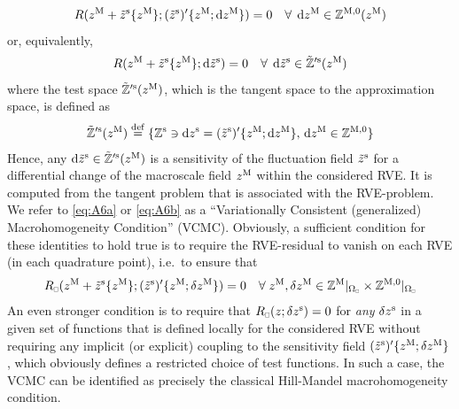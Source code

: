 \documentclass{bmcart}
\newcommand{\eqtref}[1]{\eqref{#1}}
\newcommand{\rve}{
  {\mathchoice
   {\mbox{\scalebox{0.67}{$\Box$}}}
   {\mbox{\scalebox{0.67}{$\Box$}}}
   {\mbox{\scalebox{0.5}{$\Box$}}}
   {\mbox{\scalebox{0.375}{$\Box$}}}
  }
}
\begin{document}
\begin{align}
\label{eq:A6a} R(z^\macro + \tilde z^\fluct\{z^\macro\}; (\tilde{z}^\fluct)'\{z^\macro;\dif z^\macro\}) = 0\quad \forall\;\dif z^\macro\in\set Z^{\macro,0}(z^\macro)
\end{align}
or, equivalently,
\begin{align}
\label{eq:A6b} R(z^\macro + \tilde z^\fluct\{z^\macro\}; \dif\tilde{z}^\fluct) = 0\quad \forall\;\dif\tilde{z}^\fluct\in\tilde{\set Z}'^{\fluct}(z^\macro)
\end{align}
where the test space $\tilde{\mathbb{Z}}'^{\mathrm{s}}(z^{\mathrm{M}})$, which is the tangent space to the approximation space, is defined as
\begin{align}
    \tilde{\set{Z}}'^{\fluct}(z^\macro)\defeq\{\set{Z}^\fluct\ni \dif z^\fluct = (\tilde{z}^\fluct)'\{z^\macro;\dif z^\macro\},\,
    \dif z^\macro\in \set{Z}^{\macro,0}\}
\label{eq:A6c}
\end{align}
Hence, any $\operatorname{d \!} \tilde{z}^{\mathrm{s}}\in\tilde{\mathbb{Z}}'^{\mathrm{s}}(z^{\mathrm{M}})$ is a sensitivity of the fluctuation field $\tilde{z}^{\mathrm{s}}$ for a differential change of the macroscale field $z^{\mathrm{M}}$ within the considered RVE.
It is computed from the tangent problem that is associated with the RVE-problem.
We refer to \eqtref{eq:A6a} or \eqtref{eq:A6b} as a ``Variationally Consistent (generalized) Macrohomogeneity Condition'' (VCMC).
Obviously, a sufficient condition for these identities to hold true is to require the RVE-residual to vanish on each RVE (in each quadrature point), i.e.\ to ensure that
\begin{align}
\label{eq:A8} R_\rve(z^\macro + \tilde z^\fluct\{z^\macro\};(\tilde{z}^\fluct)'\{z^\macro;\delta z^\macro\}) = 0\quad \forall\;z^\macro,\delta z^\macro\in\set Z^{\macro}|_{\Omega_\rve}\times\set Z^{\macro,0}|_{\Omega_\rve}
\end{align}
An even stronger condition is to require that $R_\rve(z;\delta z^\fluct) = 0$ for \emph{any} $\delta z^{\mathrm{s}}$ in a given set of functions that is defined locally for the considered RVE without requiring any implicit (or explicit) 
coupling to the sensitivity field $(\tilde{z}^{\mathrm{s}})'\{z^{\mathrm{M}};\delta z^{\mathrm{M}}\}$, which obviously defines a restricted choice of test functions.
In such a case, the VCMC can be identified as precisely the classical Hill-Mandel macrohomogeneity condition.
\end{document}
